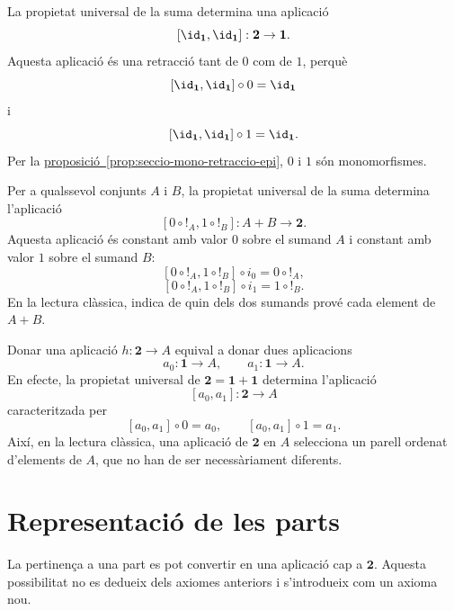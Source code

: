 \begin{prova}
La propietat universal de la suma determina una aplicació
\[
[\id_{\mathbf1},\id_{\mathbf1}]:\mathbf2\to\mathbf1.
\]
Aquesta aplicació és una retracció tant de \(0\) com de \(1\), perquè
\[
[\id_{\mathbf1},\id_{\mathbf1}]\circ0=\id_{\mathbf1}
\]
i
\[
[\id_{\mathbf1},\id_{\mathbf1}]\circ1=\id_{\mathbf1}.
\]
Per la \hyperref[prop:seccio-mono-retraccio-epi]{proposició~\ref*{prop:seccio-mono-retraccio-epi}}, \(0\) i \(1\) són monomorfismes.
\end{prova}

\begin{observacio}\label{ex:suma-cap-dos}
Per a qualssevol conjunts \(A\) i \(B\), la propietat universal de la suma determina l'aplicació
\[
[0\circ {!}_A,1\circ {!}_B]:A+B\to\mathbf2.
\]
Aquesta aplicació és constant amb valor \(0\) sobre el sumand \(A\) i constant amb valor \(1\) sobre el sumand \(B\):
\[
[0\circ {!}_A,1\circ {!}_B]\circ i_0=0\circ {!}_A,
\]
\[
[0\circ {!}_A,1\circ {!}_B]\circ i_1=1\circ {!}_B.
\]
En la lectura clàssica, indica de quin dels dos sumands prové cada element de \(A+B\).
\end{observacio}

\begin{observacio}\label{obs:dos-cap-a}
Donar una aplicació \(h:\mathbf2\to A\) equival a donar dues aplicacions
\[
a_0:\mathbf1\to A,
\qquad
a_1:\mathbf1\to A.
\]
En efecte, la propietat universal de \(\mathbf2=\mathbf1+\mathbf1\) determina l'aplicació
\[
[a_0,a_1]:\mathbf2\to A
\]
caracteritzada per
\[
[a_0,a_1]\circ0=a_0,
\qquad
[a_0,a_1]\circ1=a_1.
\]
Així, en la lectura clàssica, una aplicació de \(\mathbf2\) en \(A\) selecciona un parell ordenat d'elements de \(A\), que no han de ser necessàriament diferents.
\end{observacio}


\section{Representació de les parts}\label{representacio}

La pertinença a una part es pot convertir en una aplicació cap a \(\mathbf2\). Aquesta possibilitat no es dedueix dels axiomes anteriors i s'introdueix com un axioma nou.

